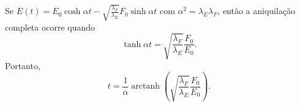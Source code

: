 Se $E(t)=E_0\cosh\alpha t-\sqrt{\frac{\lambda_F}{\lambda_E}}F_0\sinh\alpha t$ com $\alpha^{2}=\lambda_E\lambda_F$, então a aniquilação completa ocorre quando
\[
\tanh\alpha t = \sqrt{\frac{\lambda_F}{\lambda_E}}\frac{F_0}{E_0}.
\]
Portanto,
\[
t=\frac{1}{\alpha}\operatorname{arctanh}\left(\sqrt{\frac{\lambda_F}{\lambda_E}}\frac{F_0}{E_0}\right).
\]
